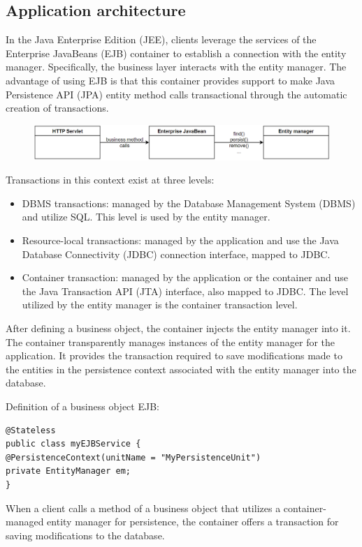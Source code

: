 \subsection{Application architecture}
In the Java Enterprise Edition (JEE), clients leverage the services of the Enterprise JavaBeans (EJB) container to establish a connection with the entity manager.
Specifically, the business layer interacts with the entity manager.
The advantage of using EJB is that this container provides support to make Java Persistence API (JPA) entity method calls transactional through the automatic creation of transactions.
\begin{figure}[H]
    \centering
    \includegraphics[width=0.75\linewidth]{images/jee1.png}
\end{figure}
Transactions in this context exist at three levels:
\begin{itemize}
    \item DBMS transactions: managed by the Database Management System (DBMS) and utilize SQL.
        This level is used by the entity manager.
    \item Resource-local transactions: managed by the application and use the Java Database Connectivity (JDBC) connection interface, mapped to JDBC.
    \item Container transaction: managed by the application or the container and use the Java Transaction API (JTA) interface, also mapped to JDBC. 
        The level utilized by the entity manager is the container transaction level.
\end{itemize}
After defining a business object, the container injects the entity manager into it.
The container transparently manages instances of the entity manager for the application.
It provides the transaction required to save modifications made to the entities in the persistence context associated with the entity manager into the database.
\begin{example}
    Definition of a business object EJB: 
    \begin{lstlisting}[style=Java]
@Stateless 
public class myEJBService {
@PersistenceContext(unitName = "MyPersistenceUnit")
private EntityManager em; 
}
    \end{lstlisting}
\end{example}
When a client calls a method of a business object that utilizes a container-managed entity manager for persistence, the container offers a transaction for saving modifications to the database.
